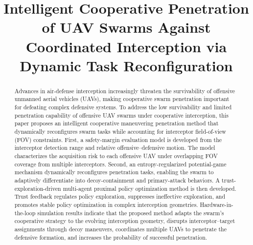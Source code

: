 \documentclass{cja}
\begin{document}
\title{Intelligent Cooperative Penetration of UAV Swarms Against Coordinated Interception via Dynamic Task Reconfiguration}


\frontheader{}

\begin{abstract}
Advances in air-defense interception increasingly threaten the survivability of offensive unmanned aerial vehicles (UAVs), making cooperative swarm penetration important for defeating complex defensive systems.
To address the low survivability and limited penetration capability of offensive UAV swarms under cooperative interception, this paper proposes an intelligent cooperative maneuvering penetration method that dynamically reconfigures swarm tasks while accounting for interceptor field-of-view (FOV) constraints.
First, a safety-margin evaluation model is developed from the interceptor detection range and relative offensive--defensive motion. The model characterizes the acquisition risk to each offensive UAV under overlapping FOV coverage from multiple interceptors.
Second, an entropy-regularized potential-game mechanism dynamically reconfigures penetration tasks, enabling the swarm to adaptively differentiate into decoy-containment and primary-attack behaviors.
A trust-exploration-driven multi-agent proximal policy optimization method is then developed. Trust feedback regulates policy exploration, suppresses ineffective exploration, and promotes stable policy optimization in complex interception geometries.
Hardware-in-the-loop simulation results indicate that the proposed method adapts the swarm's cooperative strategy to the evolving interception geometry, disrupts interceptor--target assignments through decoy maneuvers, coordinates multiple UAVs to penetrate the defensive formation, and increases the probability of successful penetration.
\end{abstract}
\end{document}
